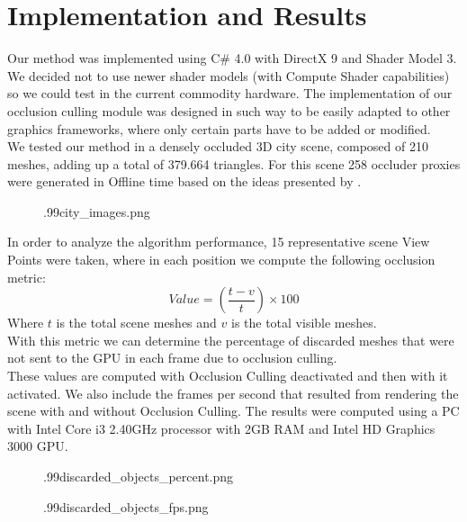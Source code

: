 \documentclass[10pt, conference]{IEEEtran}
\begin{document}
\section{Implementation and Results}
%
Our method was implemented using C\# 4.0 with DirectX 9 and Shader Model 3. 
We decided not to use newer shader models (with Compute Shader capabilities) so we could test in the current commodity hardware. 
The implementation of our occlusion culling module was designed in such way to be easily adapted to other graphics frameworks, where only certain parts have to be added or modified.\\

We tested our method in a densely occluded 3D city scene, composed of 210 meshes, adding up a total of 379.664 triangles. 
For this scene 258 occluder proxies were generated in Offline time based on the ideas presented by \cite{cacic_occlusion_1}. 

\begin{figure}[!hbp]
	{.99}{city_images.png}
\end{figure}

In order to analyze the algorithm performance, 15 representative scene View Points were taken, where in each position we compute the following 
occlusion metric:
\[
	Value = (\frac{t - v}{t}) \times 100
\]
Where $t$ is the total scene meshes and $v$ is the total visible meshes. \\
With this metric we can determine the percentage of discarded meshes that were not sent to the GPU in each frame due to occlusion culling.\\

These values are computed with Occlusion Culling deactivated and then with it activated. 
We also include the frames per second that resulted from rendering the scene with and without Occlusion Culling. 
The results were computed using a PC with Intel Core i3 2.40GHz processor with 2GB RAM and Intel HD Graphics 3000 GPU.

\begin{figure}[!hbp]
	{.99}{discarded_objects_percent.png}
\end{figure}

\begin{figure}[!hbp]
	{.99}{discarded_objects_fps.png}
\end{figure}
\end{document}
